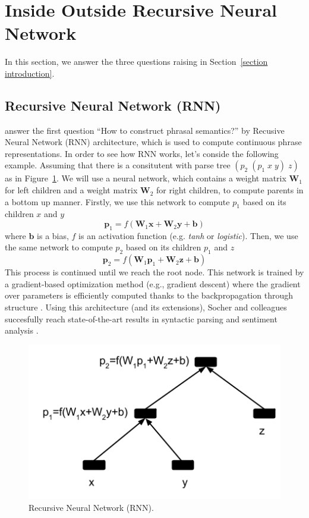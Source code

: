 \documentclass[11pt]{article}
\begin{document}

\section{Inside Outside Recursive Neural Network}
\label{section iornn}

In this section, we answer the three questions raising in Section~\ref{section introduction}.

\subsection{Recursive Neural Network (RNN)}
\label{subsection rnn}
\cite{socher_learning_2010} answer the first question ``How to construct phrasal semantics?'' 
by Recusive Neural Network (RNN) architecture, 
which is used to compute continuous phrase representations. In order to see how RNN works, 
let's conside the following example. Assuming that there is a consitutent with parse
tree $(p_2 \; (p_1 \; x \; y) \; z)$ as in Figure~\ref{figure rnn}. We will use a neural network, 
which contains a weight matrix $\mathbf{W}_1$ for left children and a weight matrix $\mathbf{W}_2$ 
for right children, to compute parents in a bottom up manner. Firstly, we use this network 
to compute $p_1$ based on its children $x$ and $y$
\begin{equation}
	\mathbf{p}_1 = f(\mathbf{W}_1 \mathbf{x} + \mathbf{W}_2 \mathbf{y} + \mathbf{b})
\end{equation}
where $\mathbf{b}$ is a bias, $f$ is an activation function (e.g. \textit{tanh} or \textit{logistic}).
Then, we use the same network to compute $p_2$ based on its children $p_1$ and $z$
\begin{equation}
	\mathbf{p}_2 = f(\mathbf{W}_1 \mathbf{p}_1 + \mathbf{W}_2 \mathbf{z} + \mathbf{b})
\end{equation}
This process is continued until we reach the root node.  This network is trained by 
a gradient-based optimization method (e.g., gradient descent) where the gradient 
over parameters is efficiently computed thanks to the backpropagation through structure
\cite{goller_learning_1996}. Using this architecture 
(and its extensions), Socher and colleagues succesfully reach 
state-of-the-art results in syntactic parsing \cite{socher2013parsing} and 
sentiment analysis \cite{socher2013recursive}. 
\begin{figure}[h!]
	\center
	\includegraphics[scale=0.5]{RNN.png}
	\caption{Recursive Neural Network (RNN).}
	\label{figure rnn}
\end{figure}
\end{document}
